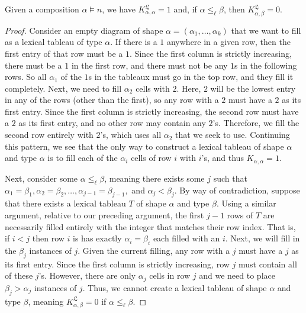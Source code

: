 \documentclass[10pt,a4paper]{amsart}
\newcommand{\lx}{\mathfrak{L}}
\begin{document}
\begin{theorem}\label{theorem:lexical_coeff}
 Given a composition $\alpha \vDash n$, we have $K^{\lx}_{\alpha, \alpha}=1$ and, if $\alpha \leq_{\ell} \beta$, then $K^{\lx}_{\alpha, \beta}=0$.
\end{theorem}

\begin{proof}
 Consider an empty diagram of shape $\alpha = (\alpha_1, \ldots, \alpha_k)$ that we want to fill as a lexical tableau of type $\alpha$. If 
 there is a $1$ anywhere in a given row, then the first entry of that row must be a $1$. Since the first column is strictly increasing, there
 must be a $1$ in the first row, and there must not be any $1$s in the following rows. So all $\alpha_1$ of the $1$s in the tableaux must 
 go in the top row, and they fill it completely. Next, we need to fill $\alpha_2$ cells with $2$. Here, $2$ will be the lowest entry in any of 
 the rows (other than the first), so any row with a $2$ must have a $2$ as its first entry. Since the first column is strictly increasing, 
 the second row must have a $2$ as its first entry, and no other row may contain any $2$'s. Therefore, we fill the second row entirely 
 with $2$'s, which uses all $\alpha_2$ that we seek to use. Continuing this pattern, we see that the only way to construct a lexical tableau 
 of shape $\alpha$ and type $\alpha$ is to fill each of the $\alpha_i$ cells of row $i$ with $i$'s, and thus  $K_{\alpha,\alpha} = 1$. 
 
 Next, consider some $\alpha \leq_{\ell} \beta$, meaning there exists some $j$ such that $\alpha_1 = \beta_1, \alpha_2 = \beta_2, \ldots, 
 \alpha_{j-1}=\beta_{j-1},$ and $\alpha_j<\beta_j$. By way of contradiction, suppose that there exists a lexical tableau $T$ of shape $\alpha$ and type $\beta$. Using a similar argument, relative to our preceding argument, the first $j-1$ rows of $T$ are necessarily filled entirely with the integer that matches their row index. That is, if $i < j$ then row 
 $i$ is has exactly $\alpha_i = \beta_i$ each filled with an $i$. Next, we will fill in the $\beta_j$ instances of $j$. Given the current filling, 
 any row with a $j$ must have a $j$ as its first entry. Since the first column is strictly increasing, row $j$ must contain all of these $j$'s. 
 However, there are only $\alpha_j$ cells in row $j$ and we need to place $\beta_j > \alpha_j$ instances of $j$. Thus, we cannot create a 
 lexical tableau of shape $\alpha$ and type $\beta$, meaning $K^{\lx}_{\alpha, \beta}=0$ if $\alpha \leq_{\ell} \beta$. 
\end{proof}
\end{document}
